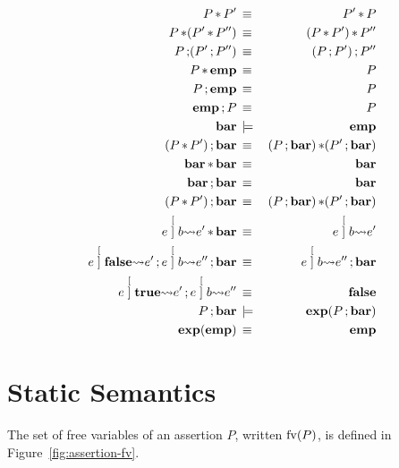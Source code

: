 \documentclass[11pt]{report}
\begin{document}
\begin{eqnarray*}
	P \sep P' & \sequiv & P' \sep P \\
	P \sep (P' \sep P'') & \sequiv & (P \sep P') \sep P'' \\
	P \seq (P' \seq P'') & \sequiv & (P \seq P') \seq P'' \\
	P \sep \emp & \sequiv & P \\
	P \seq \emp & \sequiv & P \\
	\emp \seq P & \sequiv & P \\
	\barr & \sentails & \emp \\
	(P \sep P') \seq \barr & \sequiv & (P \seq \barr) \sep (P' \seq \barr) \\
	\barr \sep \barr & \sequiv & \barr \\
	\barr \seq \barr & \sequiv & \barr \\
	(P \sep P') \seq \barr & \sequiv & (P \seq \barr) \sep (P' \seq \barr) \\
	e \writeto{}{b} e' \sep \barr & \sequiv & e \writeto{}{b} e' \\
	e \writeto{}{\bexpf} e' \seq e \writeto{}{b} e'' \seq \barr & \sequiv & e \writeto{}{b} e''\seq \barr \\ 
	e \writeto{}{\bexpt} e' \seq e \writeto{}{b} e'' & \sequiv & \bexpf \\ 
	P \seq \barr  & \sentails & \expand{P \seq \barr} \\
	\expand{\emp}  & \sequiv & \emp
\end{eqnarray*}



\section{Static Semantics} %
\label{sec:static_semantics}

The set of free variables of an assertion $P$, written $\fv{P}$, is defined in Figure~\ref{fig:assertion-fv}. 
\end{document}
